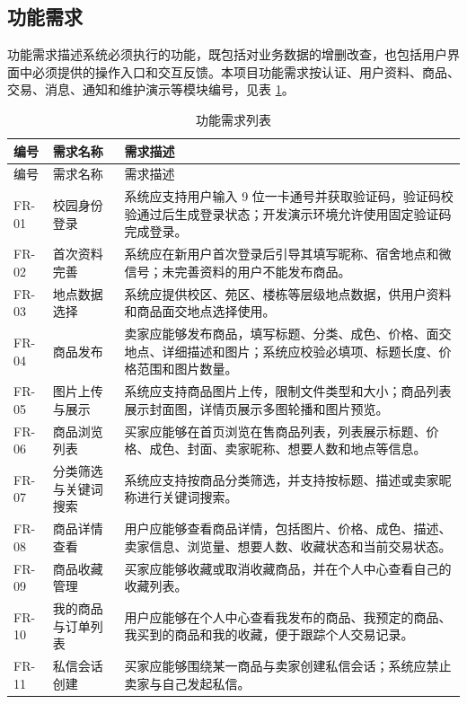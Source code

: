 ﻿\documentclass[UTF8,a4paper,12pt]{ctexart}
\begin{document}
\subsection{功能需求}
功能需求描述系统必须执行的功能，既包括对业务数据的增删改查，也包括用户界面中必须提供的操作入口和交互反馈。本项目功能需求按认证、用户资料、商品、交易、消息、通知和维护演示等模块编号，见表 \ref{tab:functional-requirements}。

\begin{longtable}{p{2.2cm}p{3.6cm}p{7.8cm}}
  \caption{功能需求列表}\label{tab:functional-requirements} \\
  \toprule
  编号 & 需求名称 & 需求描述 \\
  \midrule
  \endfirsthead
  \toprule
  编号 & 需求名称 & 需求描述 \\
  \midrule
  \endhead
  FR-01 & 校园身份登录 & 系统应支持用户输入 9 位一卡通号并获取验证码，验证码校验通过后生成登录状态；开发演示环境允许使用固定验证码完成登录。 \\
  FR-02 & 首次资料完善 & 系统应在新用户首次登录后引导其填写昵称、宿舍地点和微信号；未完善资料的用户不能发布商品。 \\
  FR-03 & 地点数据选择 & 系统应提供校区、苑区、楼栋等层级地点数据，供用户资料和商品面交地点选择使用。 \\
  FR-04 & 商品发布 & 卖家应能够发布商品，填写标题、分类、成色、价格、面交地点、详细描述和图片；系统应校验必填项、标题长度、价格范围和图片数量。 \\
  FR-05 & 图片上传与展示 & 系统应支持商品图片上传，限制文件类型和大小；商品列表展示封面图，详情页展示多图轮播和图片预览。 \\
  FR-06 & 商品浏览列表 & 买家应能够在首页浏览在售商品列表，列表展示标题、价格、成色、封面、卖家昵称、想要人数和地点等信息。 \\
  FR-07 & 分类筛选与关键词搜索 & 系统应支持按商品分类筛选，并支持按标题、描述或卖家昵称进行关键词搜索。 \\
  FR-08 & 商品详情查看 & 用户应能够查看商品详情，包括图片、价格、成色、描述、卖家信息、浏览量、想要人数、收藏状态和当前交易状态。 \\
  FR-09 & 商品收藏管理 & 买家应能够收藏或取消收藏商品，并在个人中心查看自己的收藏列表。 \\
  FR-10 & 我的商品与订单列表 & 用户应能够在个人中心查看我发布的商品、我预定的商品、我买到的商品和我的收藏，便于跟踪个人交易记录。 \\
  FR-11 & 私信会话创建 & 买家应能够围绕某一商品与卖家创建私信会话；系统应禁止卖家与自己发起私信。 \\

\end{longtable}
\end{document}
